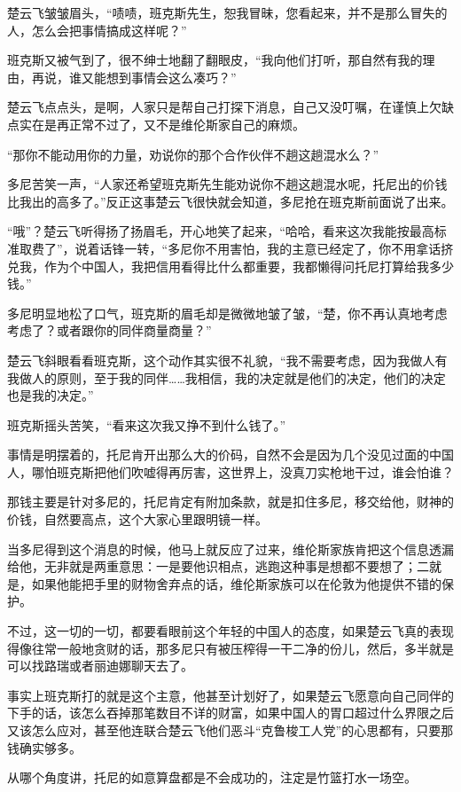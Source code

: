 楚云飞皱皱眉头，“啧啧，班克斯先生，恕我冒昧，您看起来，并不是那么冒失的人，怎么会把事情搞成这样呢？”

班克斯又被气到了，很不绅士地翻了翻眼皮，“我向他们打听，那自然有我的理由，再说，谁又能想到事情会这么凑巧？”

楚云飞点点头，是啊，人家只是帮自己打探下消息，自己又没叮嘱，在谨慎上欠缺点实在是再正常不过了，又不是维伦斯家自己的麻烦。

“那你不能动用你的力量，劝说你的那个合作伙伴不趟这趟混水么？”

多尼苦笑一声，“人家还希望班克斯先生能劝说你不趟这趟混水呢，托尼出的价钱比我出的高多了。”反正这事楚云飞很快就会知道，多尼抢在班克斯前面说了出来。

“哦”？楚云飞听得扬了扬眉毛，开心地笑了起来，“哈哈，看来这次我能按最高标准取费了”，说着话锋一转，“多尼你不用害怕，我的主意已经定了，你不用拿话挤兑我，作为个中国人，我把信用看得比什么都重要，我都懒得问托尼打算给我多少钱。”

多尼明显地松了口气，班克斯的眉毛却是微微地皱了皱，“楚，你不再认真地考虑考虑了？或者跟你的同伴商量商量？”

楚云飞斜眼看看班克斯，这个动作其实很不礼貌，“我不需要考虑，因为我做人有我做人的原则，至于我的同伴……我相信，我的决定就是他们的决定，他们的决定也是我的决定。”

班克斯摇头苦笑，“看来这次我又挣不到什么钱了。”

事情是明摆着的，托尼肯开出那么大的价码，自然不会是因为几个没见过面的中国人，哪怕班克斯把他们吹嘘得再厉害，这世界上，没真刀实枪地干过，谁会怕谁？

那钱主要是针对多尼的，托尼肯定有附加条款，就是扣住多尼，移交给他，财神的价钱，自然要高点，这个大家心里跟明镜一样。

当多尼得到这个消息的时候，他马上就反应了过来，维伦斯家族肯把这个信息透漏给他，无非就是两重意思：一是要他识相点，逃跑这种事是想都不要想了；二就是，如果他能把手里的财物舍弃点的话，维伦斯家族可以在伦敦为他提供不错的保护。

不过，这一切的一切，都要看眼前这个年轻的中国人的态度，如果楚云飞真的表现得像往常一般地贪财的话，那多尼只有被压榨得一干二净的份儿，然后，多半就是可以找路瑞或者丽迪娜聊天去了。

事实上班克斯打的就是这个主意，他甚至计划好了，如果楚云飞愿意向自己同伴的下手的话，该怎么吞掉那笔数目不详的财富，如果中国人的胃口超过什么界限之后又该怎么应对，甚至他连联合楚云飞他们恶斗“克鲁梭工人党”的心思都有，只要那钱确实够多。

从哪个角度讲，托尼的如意算盘都是不会成功的，注定是竹篮打水一场空。

